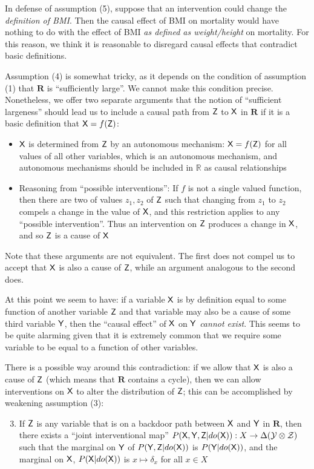 In defense of assumption (5), suppose that an intervention could change the \emph{definition of BMI}. Then the causal effect of BMI on mortality would have nothing to do with the effect of BMI \emph{as defined as weight/height} on mortality. For this reason, we think it is reasonable to disregard causal effects that contradict basic definitions.

Assumption (4) is somewhat tricky, as it depends on the condition of assumption (1) that $\mathbf{R}$ is ``sufficiently large''. We cannot make this condition precise. Nonetheless, we offer two separate arguments that the notion of ``sufficient largeness'' should lead us to include a causal path from $\mathsf{Z}$ to $\mathsf{X}$ in $\mathbf{R}$ if it is a basic definition that $\mathsf{X}=f(\mathsf{Z})$:

\begin{itemize}
	\item $\mathsf{X}$ is determined from $\mathsf{Z}$ by an autonomous mechanism: $\mathsf{X}=f(\mathsf{Z})$ for all values of all other variables, which is an autonomous mechanism, and autonomous mechanisms should be included in $\mathbb{R}$ as causal relationships
	\item Reasoning from ``possible interventions'': If $f$ is not a single valued function, then there are two of values $z_1, z_2$ of $\mathsf{Z}$ such that changing from $z_1$ to $z_2$ compels a change in the value of $\mathsf{X}$, and this restriction applies to any ``possible intervention''. Thus an intervention on $\mathsf{Z}$ produces a change in $\mathsf{X}$, and so $\mathsf{Z}$ is a cause of $\mathsf{X}$
\end{itemize}

Note that these arguments are not equivalent. The first does not compel us to accept that $\mathsf{X}$ is also a cause of $\mathsf{Z}$, while an argument analogous to the second does.

At this point we seem to have: if a variable $\mathsf{X}$ is by definition equal to some function of another variable $\mathsf{Z}$ and that variable may also be a cause of some third variable $\mathsf{Y}$, then the ``causal effect'' of $\mathsf{X}$ on $\mathsf{Y}$ \emph{cannot exist}. This seems to be quite alarming given that it is extremely common that we require some variable to be equal to a function of other variables.

There is a possible way around this contradiction: if we allow that $\mathsf{X}$ is also a cause of $\mathsf{Z}$ (which means that $\mathbf{R}$ contains a cycle), then we can allow interventions on $\mathsf{X}$ to alter the distribution of $\mathsf{Z}$; this can be accomplished by weakening assumption (3):
\begin{enumerate}[label={$\arabic*'$.}]
  \setcounter{enumi}{2}
  \item If $\mathsf{Z}$ is any variable that is on a backdoor path between $\mathsf{X}$ and $\mathsf{Y}$ in $\mathbf{R}$, then there exists a ``joint interventional map'' $P(\mathsf{X},\mathsf{Y},\mathsf{Z}|do(\mathsf{X})):X\to \Delta(\mathcal{Y}\otimes\mathcal{Z})$ such that the marginal on $\mathsf{Y}$ of $P(\mathsf{Y},\mathsf{Z}|do(\mathsf{X}))$ is $P(\mathsf{Y}|do(\mathsf{X}))$, and the marginal on $\mathsf{X}$, $P(\mathsf{X}|do(\mathsf{X}))$ is $x\mapsto \delta_x$ for all $x\in X$
\end{enumerate}

